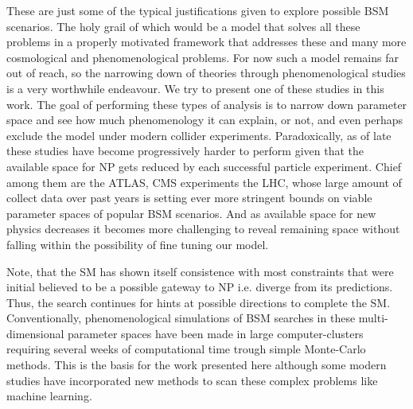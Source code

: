 These are just some of the typical justifications given to explore possible BSM scenarios. The holy grail of which would be a model that solves all these problems in a properly motivated framework that addresses these and many more cosmological and phenomenological problems.  
% 
For now\Joaoadd{,} such a model remains far out of reach, so the narrowing down of theories through phenomenological studies is a very worthwhile endeavour. We try to present one of these studies in this work. %
%
The goal of performing these types of analysis is to narrow down   parameter space and see how much phenomenology it can explain, or not, and even perhaps exclude the model under modern collider experiments.
%
Paradoxically, as of late these studies have become progressively harder to perform given that the available space for NP gets reduced by each successful particle experiment. 
%
Chief among them are the ATLAS, CMS experiments  the LHC, whose large amount of collect data over past years is setting ever more stringent bounds on viable parameter spaces of popular BSM scenarios. 
%
And as available space for new physics decreases\Joaoadd{,} it becomes more challenging to reveal remaining space without falling within the possibility of fine tuning our model.  


Note, that the SM has shown itself consistence with most constraints that were initial believed to be a possible gateway to NP i.e. diverge from its predictions. Thus, the search continues for hints at possible directions to complete the SM. %
%
Conventionally, phenomenological simulations of BSM searches in these multi-dimensional parameter spaces have been made in large computer-clusters requiring several weeks of computational time trough simple Monte-Carlo methods. 
%
This is the basis for the work presented here\Joaoadd{, } although some modern studies have incorporated new methods to scan these complex problems like machine learning. 
%

